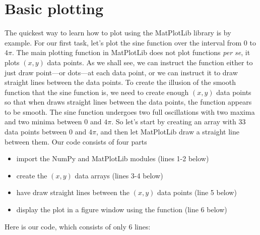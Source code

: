 \documentclass[letterpaper,10pt,english]{sphinxmanual}
\begin{document}
\section{Basic plotting}
\label{chap5/chap5_plot:chap5basicplotting}\label{chap5/chap5_plot:basic-plotting}
The quickest way to learn how to plot using the MatPlotLib library is by example.  For our first task, let's plot the sine function over the interval from 0 to $4\pi$.  The main plotting function  in MatPlotLib does not plot functions \emph{per se}, it plots $(x,y)$ data points.  As we shall see, we can instruct the function  either to just draw point---or dots---at each data point, or we can instruct it to draw straight lines between the data points.  To create the illusion of the smooth function that the sine function is, we need to create enough $(x,y)$ data points so that when  draws straight lines between the data points, the function appears to be smooth.  The sine function undergoes two full oscillations with two maxima and two minima between 0 and $4\pi$.  So let's start by creating an array with 33 data points between 0 and $4\pi$, and then let MatPlotLib draw a straight line between them.  Our code consists of four parts
\begin{itemize}
\item {} 
import the NumPy and MatPlotLib modules (lines 1-2 below)

\item {} 
create the $(x,y)$ data arrays (lines 3-4 below)

\item {} 
have  draw straight lines between the $(x,y)$ data points (line 5 below)

\item {} 
display the plot in a figure window using the  function (line 6 below)

\end{itemize}

Here is our code, which consists of only 6 lines:
\end{document}
